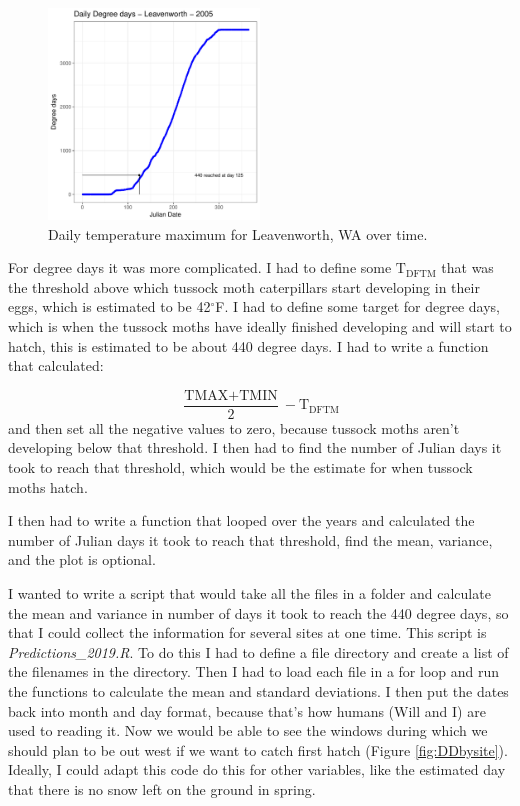 \documentclass[12pt,letter]{article}
\begin{document}
\begin{figure}
\centering
\includegraphics[width = 0.5\textwidth]{../Plots/cumulative_Leavenworth_KD.pdf}
\caption{Daily temperature maximum for Leavenworth, WA over time.}
\label{fig:cumulativeDD}
\end{figure}

For degree days it was more complicated. I had to define some $\text{T}_{\text{DFTM}}$ that was the threshold above which tussock moth caterpillars start developing in their eggs, which is estimated to be 42$^\circ$F. I had to define some target for degree days, which is when the tussock moths have ideally finished developing and will start to hatch, this is estimated to be about 440 degree days. I had to write a function that calculated: 

$$ \frac{\text{TMAX} + \text{TMIN}}{2} - \text{T}_{\text{DFTM}} $$ and then set all the negative values to zero, because tussock moths aren't developing below that threshold. I then had to find the number of Julian days it took to reach that threshold, which would be the estimate for when tussock moths hatch. 

I then had to write a function that looped over the years and calculated the number of Julian days it took to reach that threshold, find the mean, variance, and the plot is optional. 


I wanted to write a script that would take all the files in a folder and calculate the mean and variance in number of days it took to reach the 440 degree days, so that I could collect the information for several sites at one time. This script is \textit{Predictions\_2019.R}. To do this I had to define a file directory and create a list of the filenames in the directory. Then I had to load each file in a for loop and run the functions to calculate the mean and standard deviations. I then put the dates back into month and day format, because that's how humans (Will and I) are used to reading it. Now we would be able to see the windows during which we should plan to be out west if we want to catch first hatch (Figure \ref{fig:DDbysite}). Ideally, I could adapt this code do this for other variables, like the estimated day that there is no snow left on the ground in spring.
\end{document}
